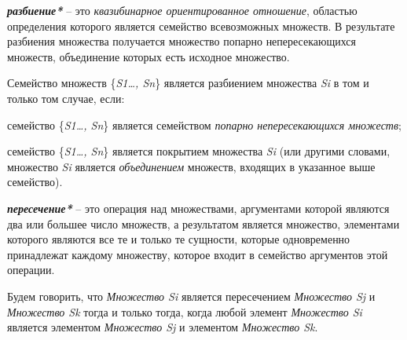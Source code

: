 \begin{SCn}
\end{SCn}
	
\textbf{\textit{разбиение*}} – это \textit{квазибинарное ориентированное отношение}, областью определения которого является семейство всевозможных множеств. В результате разбиения множества получается множество попарно непересекающихся множеств, объединение которых есть исходное множество.

Семейство множеств \{\textit{S1…, Sn}\} является разбиением множества \textit{Si} в том и только том случае, если:
\begin{textitemize}
	\item семейство \{\textit{S1…, Sn}\} является семейством \textit{попарно непересекающихся множеств};
	\item семейство \{\textit{S1…, Sn}\} является покрытием множества \textit{Si} (или другими словами, множество \textit{Si} является \textit{объединением} множеств, входящих в указанное выше семейство).
\end{textitemize}

\begin{SCn}
\end{SCn}

\textbf{\textit{пересечение*}} – это операция над множествами, аргументами которой являются два или большее число множеств, а результатом является множество, элементами которого являются все те и только те сущности, которые одновременно принадлежат каждому множеству, которое входит в семейство аргументов этой операции.

Будем говорить, что \textit{Множество Si} является пересечением \textit{Множество Sj} и \textit{Множество Sk} тогда и только тогда, когда любой элемент \textit{Множество Si} является элементом \textit{Множество Sj} и элементом \textit{Множество Sk}.

\begin{SCn}
\end{SCn}

